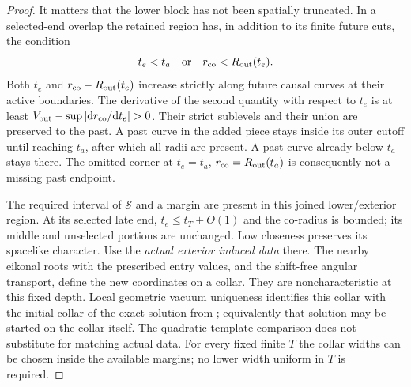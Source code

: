 \begin{proof}
It matters that the lower block has not been spatially truncated.
In a selected-end overlap the retained region has, in addition
to its finite future cuts, the condition
\begin{equation}\label{at:outer-union}
 t_e<t_a\quad\hbox{or}\quad r_{\rm co}<R_{\rm out}(t_e).
\end{equation}
Both $t_e$ and $r_{\rm co}-R_{\rm out}(t_e)$ increase strictly
along future causal curves at their active boundaries. The
derivative of the second quantity with respect to $t_e$ is at least
$V_{\rm out}-\sup|\dd r_{\rm co}/\dd t_e|>0$.
Their strict sublevels and their union are preserved to the past.
A past curve in the added piece stays inside its outer cutoff
until reaching $t_a$, after which all radii are present. A past
curve already below $t_a$ stays there. The omitted corner at
$t_e=t_a$, $r_{\rm co}=R_{\rm out}(t_a)$ is consequently not a
missing past endpoint.

The required interval of $\mathcal S$ and a margin are present
in this joined lower/exterior region. At its selected late end,
$t_e\le t_T+O(1)$ and the co-radius is bounded; its middle and
unselected portions are unchanged. Low closeness preserves its
spacelike character. Use the \emph{actual exterior induced data}
there. The nearby eikonal roots with the prescribed entry values,
and the shift-free angular transport, define the new coordinates
on a collar. They are noncharacteristic at this fixed depth.
Local geometric vacuum uniqueness identifies this collar with
the initial collar of the exact solution from
; equivalently that solution may be
started on the collar itself. The quadratic template comparison
does not substitute for matching actual data. For every fixed
finite $T$ the collar widths can be chosen inside the available
margins; no lower width uniform in $T$ is required.


\end{proof}
